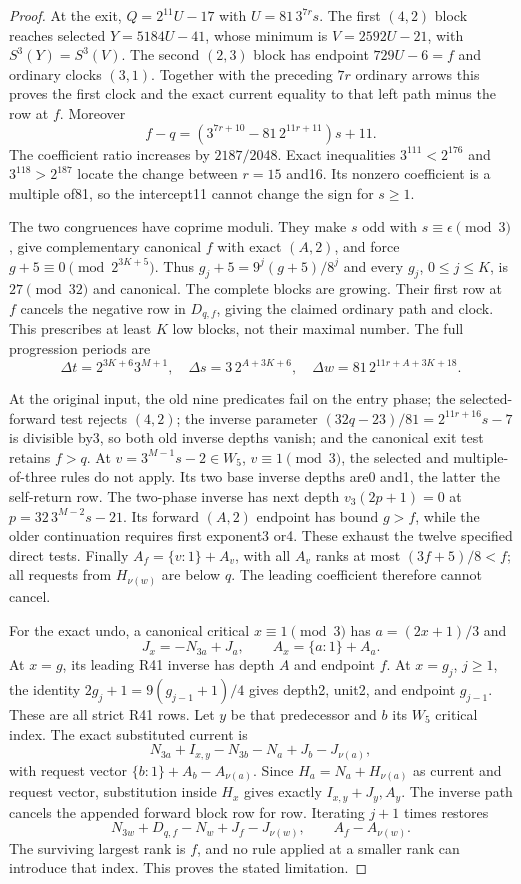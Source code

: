 \documentclass[11pt]{article}
\begin{document}
\begin{proof}
At the exit, $Q=2^{11}U-17$ with $U=81\,3^{7r}s$. The first
$(4,2)$ block reaches selected $Y=5184U-41$, whose minimum is
$V=2592U-21$, with $S^3(Y)=S^3(V)$. The second $(2,3)$ block
has endpoint $729U-6=f$ and ordinary clocks $(3,1)$. Together with
the preceding $7r$ ordinary arrows this proves the first clock and
the exact current equality to that left path minus the row at $f$.
Moreover
\[
 f-q=(3^{7r+10}-81\,2^{11r+11})s+11.
\]
The coefficient ratio increases by $2187/2048$. Exact inequalities
$3^{111}<2^{176}$ and $3^{118}>2^{187}$ locate the change between
$r=15$ and16. Its nonzero coefficient is a multiple of81, so the
intercept11 cannot change the sign for $s\ge1$.

The two congruences have coprime moduli. They make $s$ odd with
$s\equiv\epsilon\pmod3$, give complementary canonical $f$ with
exact $(A,2)$, and force $g+5\equiv0\pmod{2^{3K+5}}$.
Thus $g_j+5=9^j(g+5)/8^j$ and every $g_j$, $0\le j\le K$,
is $27\pmod{32}$ and canonical. The complete blocks are growing.
Their first row at $f$ cancels the negative row in $D_{q,f}$,
giving the claimed ordinary path and clock. This prescribes at least
$K$ low blocks, not their maximal number. The full progression periods
are
\[
 \Delta t=2^{3K+6}3^{M+1},\quad
 \Delta s=3\,2^{A+3K+6},\quad
 \Delta w=81\,2^{11r+A+3K+18}.
\]

At the original input, the old nine predicates fail on the entry phase;
the selected-forward test rejects $(4,2)$; the inverse parameter
$(32q-23)/81=2^{11r+16}s-7$ is divisible by3, so both old inverse
depths vanish; and the canonical exit test retains $f>q$.
At $v=3^{M-1}s-2\in W_5$, $v\equiv1\pmod3$, the selected
and multiple-of-three rules do not apply. Its two base inverse depths
are0 and1, the latter the self-return row. The two-phase inverse has
next depth $v_3(2p+1)=0$ at $p=32\,3^{M-2}s-21$.
Its forward $(A,2)$ endpoint has bound $g>f$, while the older
continuation requires first exponent3 or4. These exhaust the twelve
specified direct tests. Finally
$A_f=\{v:1\}+A_v$, with all $A_v$ ranks at most $(3f+5)/8<f$;
all requests from $H_{\nu(w)}$ are below $q$. The leading coefficient
therefore cannot cancel.

For the exact undo, a canonical critical $x\equiv1\pmod3$ has
$a=(2x+1)/3$ and
\[
 J_x=-N_{3a}+J_a,\qquad A_x=\{a:1\}+A_a.
\]
At $x=g$, its leading R41 inverse has depth $A$ and endpoint $f$.
At $x=g_j$, $j\ge1$, the identity
$2g_j+1=9(g_{j-1}+1)/4$ gives depth2, unit2, and endpoint
$g_{j-1}$. These are all strict R41 rows. Let $y$ be that predecessor
and $b$ its $W_5$ critical index. The exact substituted current is
\[
 N_{3a}+I_{x,y}-N_{3b}-N_a+J_b-J_{\nu(a)},
\]
with request vector $\{b:1\}+A_b-A_{\nu(a)}$.
Since $H_a=N_a+H_{\nu(a)}$ as current and request vector,
substitution inside $H_x$ gives exactly $I_{x,y}+J_y,A_y$.
The inverse path cancels the appended forward block row for row.
Iterating $j+1$ times restores
\[
 N_{3w}+D_{q,f}-N_w+J_f-J_{\nu(w)},\qquad
 A_f-A_{\nu(w)}.
\]
The surviving largest rank is $f$, and no rule applied at a smaller
rank can introduce that index. This proves the stated limitation.
\end{proof}
\end{document}
